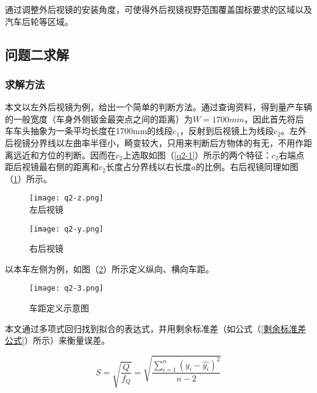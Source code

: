 \documentclass[withoutpreface,bwprint]{cumcmthesis} %
\begin{document}
\par 通过调整外后视镜的安装角度，可使得外后视镜视野范围覆盖国标要求的区域以及汽车后轮等区域。
 
\subsection{问题二求解}
\subsubsection{求解方法}

\par 本文以左外后视镜为例，给出一个简单的判断方法。通过查询资料，得到量产车辆的一般宽度（车身外侧钣金最突点之间的距离）为$W=1700mm$，因此首先将后车车头抽象为一条平均长度在1700mm的线段$c_1$，反射到后视镜上为线段$c_2$。左外后视镜分界线以左曲率半径小，畸变较大，只用来判断后方物体的有无，不用作距离远近和方位的判断。因而在$c_2$上选取如图（\ref{q2-1}）所示的两个特征：$c_2$右端点距后视镜最右侧的距离和$c_2$长度占分界线以右长度$a$的比例。右后视镜同理如图（\ref{q2-2}）所示。



\begin{figure}[!htbp]  
\begin{minipage}[t]{0.5\textwidth}
\centering  
\texttt{[image: q2-z.png]} \\
\caption{左后视镜} \label{q2-1}
\end{minipage}
\hspace{1ex}
\begin{minipage}[t]{0.5\textwidth}  
\centering  
\texttt{[image: q2-y.png]}\\
\caption{右后视镜}  \label{q2-2}
\end{minipage}  
\end{figure} 

\par 以本车左侧为例，如图（\ref{q2-3}）所示定义纵向、横向车距。

\begin{figure}[!htbp]
\small
\centering
\texttt{[image: q2-3.png]}
\caption{车距定义示意图} \label{q2-3}
\end{figure}

\par 本文通过多项式回归找到拟合的表达式，并用剩余标准差（如公式（\ref{剩余标准差公式}）所示）来衡量误差。

\begin{equation}
\label{剩余标准差公式}
	S = \sqrt{\frac{Q}{f_Q}} = \sqrt{\frac{\sum\limits_{i = 1}^{n} \left( y_i - \hat{y_i} \right)^2}{n-2}}
\end{equation}
\end{document}
